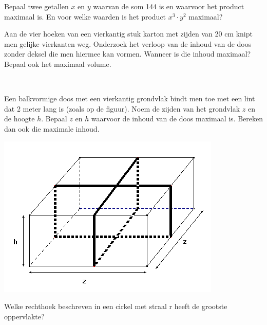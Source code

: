 \documentclass[a4paper,12pt,twoside]{article}
\begin{document}
\begin{oefening}
  Bepaal twee getallen $x$ en $y$ waarvan de som 144 is en waarvoor het product maximaal
  is. En voor welke waarden is het product $x^3\cdot y^2$ maximaal?
\end{oefening}

\begin{oefening}
  Aan de vier hoeken van een vierkantig stuk karton met zijden van 20 cm knipt men gelijke vierkanten weg. Onderzoek het verloop van de inhoud van de doos zonder deksel die men hiermee kan vormen. Wanneer is die inhoud maximaal? Bepaal ook het maximaal volume.
\end{oefening}

\begin{oefening}\\
  \begin{minipage}{0.6\textwidth}
    Een balkvormige doos met een vierkantig grondvlak bindt men toe met een lint dat
    2 meter lang is (zoals op de figuur). Noem de zijden van het grondvlak $z$ en de hoogte
    $h$. Bepaal $z$ en $h$ waarvoor de inhoud van de doos maximaal is. Bereken dan ook die
    maximale inhoud.
  \end{minipage}
  \begin{minipage}{0.4\textwidth}
    \centering
    \includegraphics[width=\textwidth]{doos-met-lint}
  \end{minipage}
\end{oefening}

\begin{oefening}
  Welke rechthoek beschreven in een cirkel met straal r heeft de grootste oppervlakte?
\end{oefening}
\end{document}

